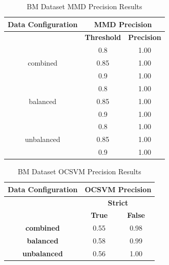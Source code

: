 \documentclass{mpaper}
\begin{document}
\begin{table}[]
\centering
\begin{tabular}{|c|cc|}
\hline
\textbf{Data Configuration} & \multicolumn{2}{c|}{\textbf{MMD Precision}}                  \\ \hline
\textbf{}                   & \multicolumn{1}{c|}{\textbf{Threshold}} & \textbf{Precision} \\ \hline
                            & \multicolumn{1}{c|}{0.8}                & 1.00               \\
combined                    & \multicolumn{1}{c|}{0.85}               & 1.00               \\
                            & \multicolumn{1}{c|}{0.9}                & 1.00               \\ \hline
                            & \multicolumn{1}{c|}{0.8}                & 1.00               \\
balanced                    & \multicolumn{1}{c|}{0.85}               & 1.00               \\
                            & \multicolumn{1}{c|}{0.9}                & 1.00               \\ \hline
                            & \multicolumn{1}{c|}{0.8}                & 1.00               \\
unbalanced                  & \multicolumn{1}{c|}{0.85}               & 1.00               \\
                            & \multicolumn{1}{c|}{0.9}                & 1.00               \\ \hline
\end{tabular}
\caption{\label{tab:bm_mmd_precision}BM Dataset MMD Precision Results}
\end{table}

\begin{table}[]
\centering
\begin{tabular}{|c|cc|}
\hline
\textbf{Data   Configuration} & \multicolumn{2}{c|}{\textbf{OCSVM Precision}} \\ \hline
\textbf{}                     & \multicolumn{2}{c|}{\textbf{Strict}}          \\ \cline{2-3} 
\textbf{}                     & \textbf{True}         & \textbf{False}        \\ \hline
\textbf{combined}             & 0.55                  & 0.98                  \\
\textbf{balanced}             & 0.58                  & 0.99                  \\
\textbf{unbalanced}           & 0.56                  & 1.00                  \\ \hline
\end{tabular}
\caption{\label{tab:bm_ocsvm_precision}BM Dataset OCSVM Precision Results}
\end{table}
\end{document}
